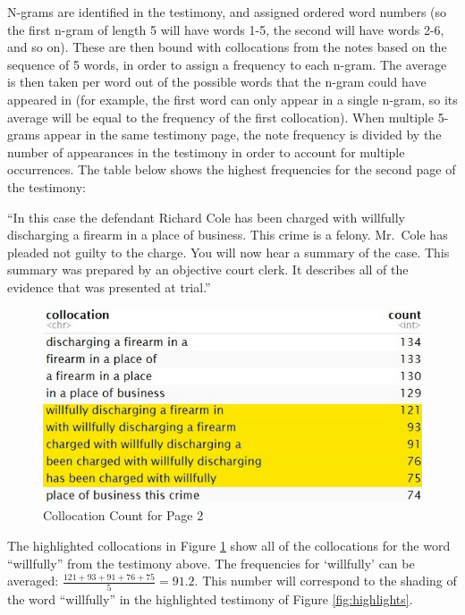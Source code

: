 \documentclass[print]{nuthesis}
\begin{document}
N-grams are identified in the testimony, and assigned ordered word numbers (so the first n-gram of length 5 will have words 1-5, the second will have words 2-6, and so on).
These are then bound with collocations from the notes based on the sequence of 5 words, in order to assign a frequency to each n-gram.
The average is then taken per word out of the possible words that the n-gram could have appeared in (for example, the first word can only appear in a single n-gram, so its average will be equal to the frequency of the first collocation).
When multiple 5-grams appear in the same testimony page, the note frequency is divided by the number of appearances in the testimony in order to account for multiple occurrences.
The table below shows the highest frequencies for the second page of the testimony:

``In this case the defendant Richard Cole has been charged with willfully discharging a firearm in a place of business. This crime is a felony.
Mr.~Cole has pleaded not guilty to the charge.
You will now hear a summary of the case.
This summary was prepared by an objective court clerk.
It describes all of the evidence that was presented at trial.''

\begin{figure}

{\centering \includegraphics[width=\linewidth]{images/collocationcount} 

}

\caption{Collocation Count for Page 2}\label{fig:colcount}
\end{figure}

The highlighted collocations in Figure \ref{fig:colcount} show all of the collocations for the word ``willfully'' from the testimony above.
The frequencies for `willfully' can be averaged: \(\frac{121+93+91+76+75}{5}=91.2\).
This number will correspond to the shading of the word ``willfully'' in the highlighted testimony of Figure \ref{fig:highlights}.
\end{document}
